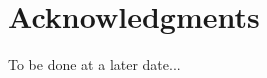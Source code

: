 \documentclass{sig-alternate}
\begin{document}
\section*{Acknowledgments}
\label{sec:acknowledgments}

To be done at a later date...



  
\end{document}
